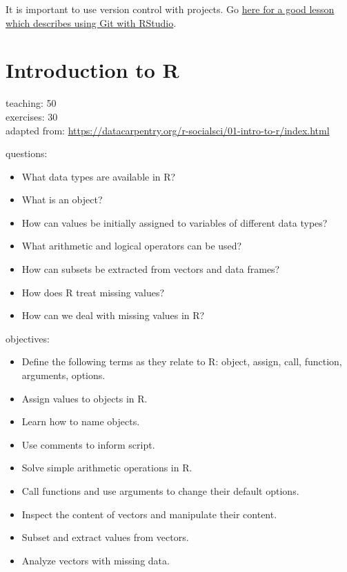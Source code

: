 \documentclass[]{book}
\providecommand{\tightlist}{%
  \setlength{\itemsep}{0pt}\setlength{\parskip}{0pt}}
\begin{document}
It is important to use version control with projects. Go
\href{https://swcarpentry.github.io/git-novice/14-supplemental-rstudio/}{here
for a good lesson which describes using Git with RStudio}.

\chapter{Introduction to R}\label{basicR}

teaching: 50\\
exercises: 30\\
adapted from:
\url{https://datacarpentry.org/r-socialsci/01-intro-to-r/index.html}

questions:

\begin{itemize}
\tightlist
\item
  What data types are available in R?\\
\item
  What is an object?\\
\item
  How can values be initially assigned to variables of different data
  types?\\
\item
  What arithmetic and logical operators can be used?\\
\item
  How can subsets be extracted from vectors and data frames?\\
\item
  How does R treat missing values?\\
\item
  How can we deal with missing values in R?
\end{itemize}

objectives:

\begin{itemize}
\tightlist
\item
  Define the following terms as they relate to R: object, assign, call,
  function, arguments, options.\\
\item
  Assign values to objects in R.\\
\item
  Learn how to name objects.\\
\item
  Use comments to inform script.\\
\item
  Solve simple arithmetic operations in R.\\
\item
  Call functions and use arguments to change their default options.\\
\item
  Inspect the content of vectors and manipulate their content.\\
\item
  Subset and extract values from vectors.\\
\item
  Analyze vectors with missing data.
\end{itemize}
\end{document}
